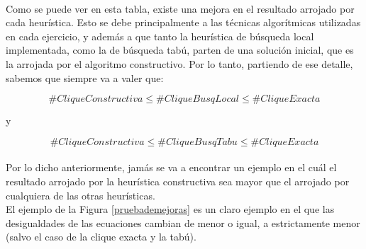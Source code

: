 \vspace*{1cm}

\paragraph{}
Como se puede ver en esta tabla, existe una mejora en el resultado arrojado por cada heurística. Esto se debe principalmente a las técnicas algorítmicas utilizadas en cada ejercicio, y además a que tanto la heurística de búsqueda local implementada, como la de búsqueda tabú, parten de una solución inicial, que es la arrojada por el algoritmo constructivo. Por lo tanto, partiendo de ese detalle, sabemos que siempre va a valer que:

\begin{equation}
 \#CliqueConstructiva \le \#CliqueBusqLocal \le \#CliqueExacta
\label{mejoras1}
\end{equation}

y

\begin{equation}
 \#CliqueConstructiva \le \#CliqueBusqTabu \le \#CliqueExacta
\label{mejoras2}
\end{equation}

\paragraph{}
Por lo dicho anteriormente, jamás se va a encontrar un ejemplo en el cuál el resultado arrojado por la heurística constructiva sea mayor que el arrojado por cualquiera de las otras heurísticas.\\
El ejemplo de la Figura \ref{pruebademejoras} es un claro ejemplo en el que las desigualdades de las ecuaciones cambian de menor o igual, a estrictamente menor (salvo el caso de la clique exacta y la tabú).

